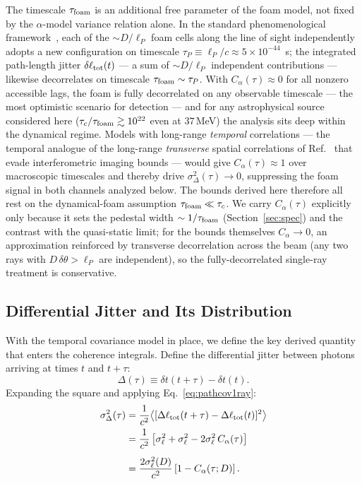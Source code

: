 \documentclass[aps,prd,onecolumn,amsmath,amssymb]{revtex4-2}
\begin{document}
The timescale $\tau_{\rm foam}$ is an additional free parameter of the
foam model, not fixed by the $\alpha$-model variance relation alone.
In the standard phenomenological framework~\cite{AmelinoCamelia2013,Ng2003},
each of the $\sim D/\ell_P$ foam cells along the line of sight
independently adopts a new configuration on timescale
$\tau_P \equiv \ell_P/c \approx 5\times10^{-44}$~s; the integrated
path-length jitter $\delta\ell_{\rm tot}(t)$ --- a sum of
$\sim D/\ell_P$ independent contributions --- likewise decorrelates on
timescale $\tau_{\rm foam}\sim\tau_P$.  With $C_\alpha(\tau)\approx 0$
for all nonzero accessible lags, the foam is fully decorrelated on any
observable timescale --- the most optimistic scenario for detection ---
and for any astrophysical source considered here
($\tau_c/\tau_{\rm foam}\gtrsim 10^{22}$ even at $37$\,MeV) the
analysis sits deep within the dynamical regime.  Models with long-range
\emph{temporal} correlations --- the temporal analogue of the
long-range \emph{transverse} spatial correlations of
Ref.~\cite{LeeZurekChen2024} that evade interferometric imaging bounds
--- would give $C_\alpha(\tau)\approx 1$ over macroscopic timescales
and thereby drive $\sigma_\Delta^2(\tau)\to 0$, suppressing the foam
signal in both channels analyzed below.  The bounds derived here
therefore all rest on the dynamical-foam assumption
$\tau_{\rm foam}\ll\tau_c$.  We carry $C_\alpha(\tau)$ explicitly only
because it sets the pedestal width $\sim 1/\tau_{\rm foam}$
(Section~\ref{sec:spec}) and the contrast with the quasi-static limit; for
the bounds themselves $C_\alpha\!\to\!0$, an approximation reinforced by
transverse decorrelation across the beam (any two rays with
$D\,\delta\theta>\ell_P$ are independent), so the fully-decorrelated
single-ray treatment is conservative.

\subsection{Differential Jitter and Its Distribution}
\label{sec:differential_jitter}

With the temporal covariance model in place, we define the key derived quantity
that enters the coherence integrals.
Define the differential jitter between photons arriving at
times $t$ and $t+\tau$:
\begin{equation}
  \Delta(\tau)
  \equiv \delta t(t+\tau) - \delta t(t).
  \label{eq:DeltaExt}
\end{equation}
Expanding the square and applying Eq.~\eqref{eq:pathcov1ray}:
\begin{align}
  \sigma_\Delta^2(\tau)
  &= \frac{1}{c^2}\big\langle
    [\Delta\ell_{\rm tot}(t+\tau)
     - \Delta\ell_{\rm tot}(t)]^2
    \big\rangle \notag \\
  &= \frac{1}{c^2}\left[
    \sigma_\ell^2 + \sigma_\ell^2
    - 2\sigma_\ell^2\,C_\alpha(\tau)
    \right] \notag \\[4pt]
  &= \frac{2\sigma_\ell^2(D)}{c^2}
    \left[1 - C_\alpha(\tau;D)\right].
  \label{eq:diffVarExt}
\end{align}
\end{document}
